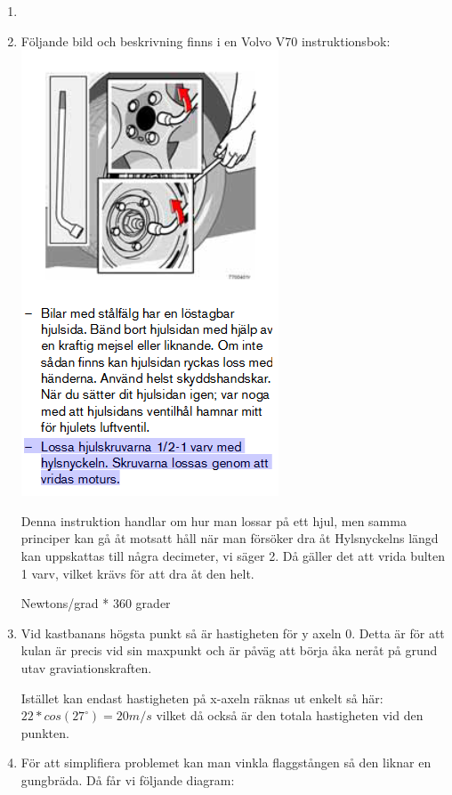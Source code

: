 \documentclass[a4paper,12pt]{article}
\begin{document}
\begin{enumerate}
   \item 

   \item Följande bild och beskrivning finns i en Volvo V70 instruktionsbok:
   \includegraphics{Figur.png}

    Denna instruktion handlar om hur man lossar på ett hjul, men samma principer
    kan gå åt motsatt håll när man försöker dra åt 
    Hylsnyckelns längd kan uppskattas till några decimeter, vi säger 2. Då gäller det att vrida
    bulten 1 varv, vilket krävs för att dra åt den helt. 

    Newtons/grad * 360 grader 


    \item Vid kastbanans högsta punkt så är hastigheten för y axeln 0. Detta är för att
    kulan är precis vid sin maxpunkt och är påväg att börja åka neråt på grund utav
    graviationskraften.

    Istället kan endast hastigheten på x-axeln räknas ut enkelt så här:
    $22*cos(27^\circ)=20 m/s$ vilket då också är den totala hastigheten vid den punkten.

    \item För att simplifiera problemet kan man vinkla flaggstången så den liknar
    en gungbräda. Då får vi följande diagram:
    

\end{enumerate}
\end{document}
